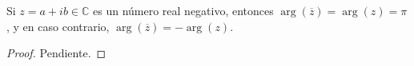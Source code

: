 

\begin{proposition}
Si $z = a + i b \in \mathbb{C}$ es un número real negativo, entonces $\arg(\overline{z}) = \arg(z) = \pi$, y en caso contrario, $\arg(\overline{z}) = - \arg(z)$.
\end{proposition}

\begin{proof}
Pendiente.
\end{proof}
